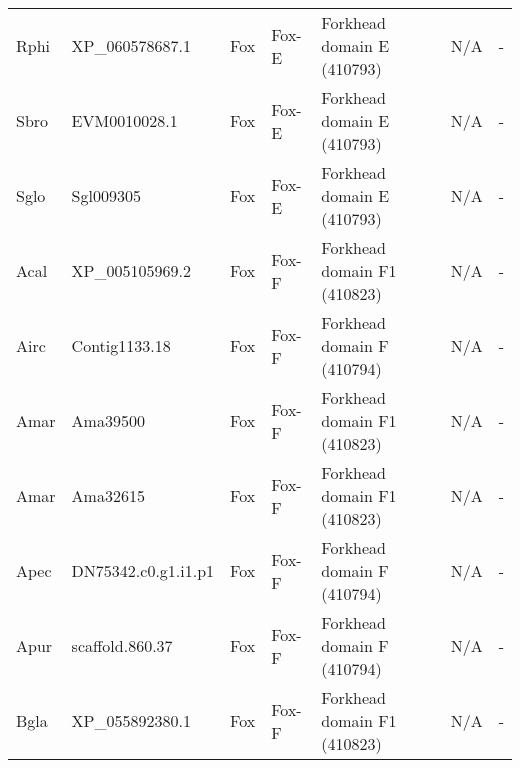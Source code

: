 \documentclass[../main.tex]{subfiles}
\begin{document}
\begin{landscape}
\begin{longtable}{lllllll}
		Rphi           & XP\_060578687.1       & Fox            & Fox-E               & Forkhead domain E (410793)                  & N/A                                                                    & -                    \\
		Sbro           & EVM0010028.1          & Fox            & Fox-E               & Forkhead domain E (410793)                  & N/A                                                                    & -                    \\
		Sglo           & Sgl009305             & Fox            & Fox-E               & Forkhead domain E (410793)                  & N/A                                                                    & -                    \\
		Acal           & XP\_005105969.2       & Fox            & Fox-F               & Forkhead domain F1 (410823)                 & N/A                                                                    & -                    \\
		Airc           & Contig1133.18         & Fox            & Fox-F               & Forkhead domain F (410794)                  & N/A                                                                    & -                    \\
		Amar           & Ama39500              & Fox            & Fox-F               & Forkhead domain F1 (410823)                 & N/A                                                                    & -                    \\
		Amar           & Ama32615              & Fox            & Fox-F               & Forkhead domain F1 (410823)                 & N/A                                                                    & -                    \\
		Apec           & DN75342.c0.g1.i1.p1   & Fox            & Fox-F               & Forkhead domain F (410794)                  & N/A                                                                    & -                    \\
		Apur           & scaffold.860.37       & Fox            & Fox-F               & Forkhead domain F (410794)                  & N/A                                                                    & -                    \\
		Bgla           & XP\_055892380.1       & Fox            & Fox-F               & Forkhead domain F1 (410823)                 & N/A                                                                    & -                    \\

\end{longtable}
\end{landscape}
\end{document}
